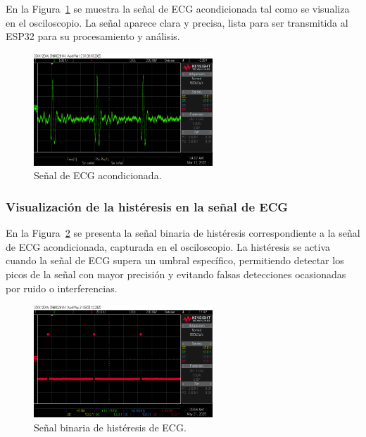         En la Figura~\ref{fig:ECG_Osciloscopio} se muestra la señal de ECG acondicionada tal como se visualiza en el osciloscopio. La señal aparece clara y precisa, lista para ser transmitida al ESP32 para su procesamiento y análisis.

        \begin{figure}[H]
            \centering
            \includegraphics[width=0.6\textwidth]{img/Desarrollo/electro_osciloscopio.png}
            \caption{Señal de ECG acondicionada.}
            \label{fig:ECG_Osciloscopio}
        \end{figure}

        \subsubsection{Visualización de la histéresis en la señal de ECG}

        En la Figura~\ref{fig:ECG_Osciloscopio_Histeresis} se presenta la señal binaria de histéresis correspondiente a la señal de ECG acondicionada, capturada en el osciloscopio. La histéresis se activa cuando la señal de ECG supera un umbral específico, permitiendo detectar los picos de la señal con mayor precisión y evitando falsas detecciones ocasionadas por ruido o interferencias.

        \begin{figure}[H]
            \centering
            \includegraphics[width=0.6\textwidth]{img/Desarrollo/histerisisECG.png}
            \caption[Señal de histéresis de ECG.]{Señal binaria de histéresis de ECG.\footnotemark}
            \label{fig:ECG_Osciloscopio_Histeresis}
        \end{figure}

